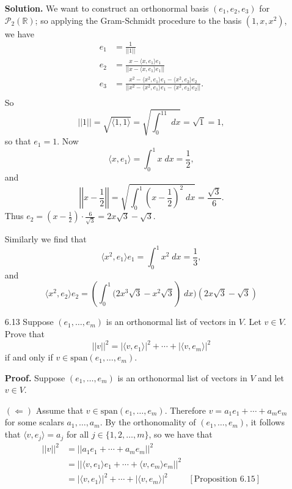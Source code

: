 \documentclass[9pt]{article}
\newcommand{\R}{\mathbb{R}}
\newcommand{\cyc}[1]{\langle #1 \rangle}
\begin{document}
\begin{enumerate}
      \textbf{Solution.} We want to construct an orthonormal basis
      $(e_1, e_2, e_3)$ for $\mathcal{P}_2(\R)$; so applying the Gram-Schmidt
      procedure to the basis $(1, x, x^2)$, we have
      \begin{align*}
         e_1 &= \frac{1}{||1||} \\
         e_2 &= \frac{x - \cyc{x, e_1}e_1}{||x - \cyc{x, e_1}e_1||} \\
         e_3 &= \frac{x^2 - \cyc{x^2, e_1}e_1 - \cyc{x^2, e_2}e_2}
                     {||x^2 - \cyc{x^2, e_1}e_1 - \cyc{x^2, e_2}e_2||}. \\
      \end{align*}
      So $$||1|| = \sqrt{\cyc{1, 1}} = \sqrt{\int_0^11\;dx} = \sqrt{1} = 1,$$
      so that $e_1 = 1$. Now
      $$\cyc{x, e_1} = \int_0^1x\;dx = \frac{1}{2},$$
      and
      $$
         \left|\left|x - \frac{1}{2}\right|\right| = \sqrt{\int_0^1\left(x - \frac{1}{2}\right)^2\;dx}
                 = \frac{\sqrt{3}}{6}.$$
      Thus $\displaystyle e_2 = (x - \frac{1}{2}) \cdot \frac{6}{\sqrt{3}} = 2x\sqrt{3} - \sqrt{3}.$

      Similarly we find that
      $$\cyc{x^2, e_1}e_1 = \int_0^1 x^2\;dx = \frac{1}{3},$$
      and
      $$\cyc{x^2, e_2}e_2 = \left(\int_0^1(2x^3\sqrt{3} - x^2\sqrt{3}\right)\;dx)(2x\sqrt{3} - \sqrt{3})$$
   \item[6.13] Suppose $(e_1, \ldots, e_m)$ is an orthonormal list of vectors in
               $V$. Let $v \in V$. Prove that
               $$||v||^2 = |\cyc{v, e_1}|^2 + \cdots + |\cyc{v, e_m}|^2$$
               if and only if $v \in \text{span}(e_1, \ldots, e_m)$.
               
      \textbf{Proof.} Suppose $(e_1, \ldots, e_m)$ is an orthonormal list of
      vectors in $V$ and let $v \in V$.
      
      $(\Leftarrow)$ Assume that $v \in \text{span}(e_1, \ldots, e_m)$.
      Therefore $v = a_1e_1 + \cdots + a_me_m$ for some scalars
      $a_1, \ldots, a_m$. By the orthonomality of $(e_1, \ldots, e_m)$, it
      follows that $\cyc{v, e_j} = a_j$ for all $j \in \{1, 2,  \ldots, m\}$, so
      we have that
      \begin{align*}
         ||v||^2 &= ||a_1e_1 + \cdots + a_me_m||^2 \\
                 &= ||\cyc{v, e_1}e_1 + \cdots + \cyc{v, e_m}e_m||^2 \\
                 &= |\cyc{v, e_1}|^2 + \cdots + |\cyc{v, e_m}|^2
                    &[\text{Proposition }6.15]
      \end{align*}
      

\end{enumerate}
\end{document}
